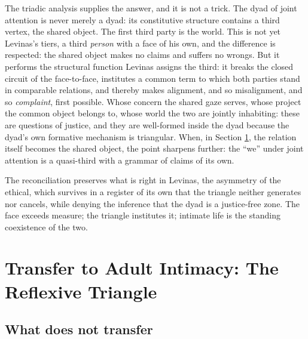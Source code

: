 The triadic analysis supplies the answer, and it is not a trick. The dyad of joint attention is never merely a dyad: its constitutive structure contains a third vertex, the shared object. The first third party is the world. This is not yet Levinas's tiers, a third \emph{person} with a face of his own, and the difference is respected: the shared object makes no claims and suffers no wrongs. But it performs the structural function Levinas assigns the third: it breaks the closed circuit of the face-to-face, institutes a common term to which both parties stand in comparable relations, and thereby makes alignment, and so misalignment, and so \emph{complaint}, first possible. Whose concern the shared gaze serves, whose project the common object belongs to, whose world the two are jointly inhabiting: these are questions of justice, and they are well-formed inside the dyad because the dyad's own formative mechanism is triangular. When, in Section \ref{p05:sec:transfer}, the relation itself becomes the shared object, the point sharpens further: the ``we'' under joint attention is a quasi-third with a grammar of claims of its own.

The reconciliation preserves what is right in Levinas, the asymmetry of the ethical, which survives in a register of its own that the triangle neither generates nor cancels, while denying the inference that the dyad is a justice-free zone. The face exceeds measure; the triangle institutes it; intimate life is the standing coexistence of the two.

\section{Transfer to Adult Intimacy: The Reflexive Triangle}
\label{p05:sec:transfer}

\subsection{What does not transfer}

